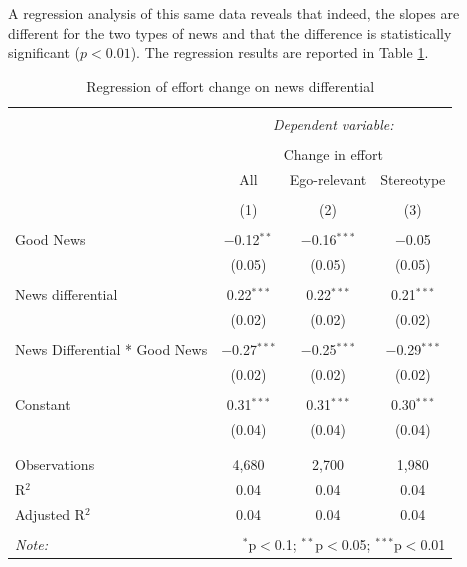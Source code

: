 \documentclass[
  12pt,
]{article}
\begin{document}
A regression analysis of this same data reveals that indeed, the slopes
are different for the two types of news and that the difference is
statistically significant (\(p<0.01\)). The regression results are
reported in Table \ref{tab:regression}.

\begin{table}[!htbp] \centering 
  \caption{Regression of effort change on news differential} 
  \label{tab:regression} 
\begin{tabular}{@{\extracolsep{5pt}}lccc} 
\\[-1.8ex]\hline 
\hline \\[-1.8ex] 
 & \multicolumn{3}{c}{\textit{Dependent variable:}} \\ 
\cline{2-4} 
\\[-1.8ex] & \multicolumn{3}{c}{Change in effort} \\ 
 & All & Ego-relevant & Stereotype \\ 
\\[-1.8ex] & (1) & (2) & (3)\\ 
\hline \\[-1.8ex] 
 Good News & $-$0.12$^{**}$ & $-$0.16$^{***}$ & $-$0.05 \\ 
  & (0.05) & (0.05) & (0.05) \\ 
  & & & \\ 
 News differential & 0.22$^{***}$ & 0.22$^{***}$ & 0.21$^{***}$ \\ 
  & (0.02) & (0.02) & (0.02) \\ 
  & & & \\ 
 News Differential * Good News & $-$0.27$^{***}$ & $-$0.25$^{***}$ & $-$0.29$^{***}$ \\ 
  & (0.02) & (0.02) & (0.02) \\ 
  & & & \\ 
 Constant & 0.31$^{***}$ & 0.31$^{***}$ & 0.30$^{***}$ \\ 
  & (0.04) & (0.04) & (0.04) \\ 
  & & & \\ 
\hline \\[-1.8ex] 
Observations & 4,680 & 2,700 & 1,980 \\ 
R$^{2}$ & 0.04 & 0.04 & 0.04 \\ 
Adjusted R$^{2}$ & 0.04 & 0.04 & 0.04 \\ 
\hline 
\hline \\[-1.8ex] 
\textit{Note:}  & \multicolumn{3}{r}{$^{*}$p$<$0.1; $^{**}$p$<$0.05; $^{***}$p$<$0.01} \\ 
\end{tabular} 
\end{table}
\end{document}
